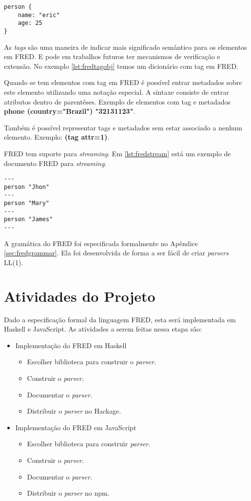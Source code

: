 \begin{lstlisting}[caption=Exemplo de dicionário com Tag em FRED,label={lst:fredtagobj}]
person {
    name: "eric"
    age: 25
}
\end{lstlisting}
    
As \textit{tags} são uma maneira de indicar mais significado semântico para os elementos em FRED. E pode
em trabalhos futuros ter mecanismos de verificação e extensão. No exemplo \ref{lst:fredtagobj} 
temos um dicionário com tag em FRED.

Quando se tem elementos com tag em FRED é possível entrar metadados sobre este elemento utilizando uma notação
especial. A sintaxe consiste de entrar atributos dentro de parentêses. Exemplo de elementos com 
tag e metadados \textbf{phone (country="Brazil") "32131123"}.

Também é possível representar tags e metadados sem estar associado a nenhum elemento. 
Exemplo: \textbf{(tag attr=1)}.

FRED tem suporte para \textit{streaming}. Em \ref{lst:fredstream} está
um exemplo de documento FRED para \textit{streaming}.

\begin{lstlisting}[caption=Exemplo de documento com streaming em FRED,label={lst:fredstream}]
---
person "Jhon"
---
person "Mary"
---
person "James"
---
\end{lstlisting}

A gramática do FRED foi especificada formalmente no Apêndice \ref{sec:fredgrammar}.
Ela foi desenvolvida de forma a ser fácil de criar \textit{parsers} LL(1).
 
\section{Atividades do Projeto}

Dado a especificação formal da linguagem FRED, esta será implementada em Haskell e JavaScript.
As atividades a serem feitas nessa etapa são:

\begin{itemize}
    \item Implementação do FRED em Haskell
    \begin{itemize}
        \item Escolher biblioteca para construir o \textit{parser}.
        \item Construir o \textit{parser}.
        \item Documentar o \textit{parser}.
        \item Distribuir o \textit{parser} no Hackage.
    \end{itemize}
    \item Implementação do FRED em JavaScript
    \begin{itemize}
        \item Escolher biblioteca para construir \textit{parser}.
        \item Construir o \textit{parser}.
        \item Documentar o \textit{parser}.
        \item Distribuir o \textit{parser} no npm.
    \end{itemize}
\end{itemize}

